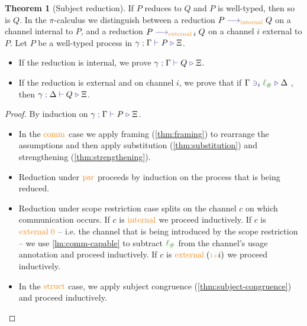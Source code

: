 \documentclass[a4paper,UKenglish,cleveref,autoref,thm-restate,authorcolumns]{lipics-v2019}
\theoremstyle{definition}
\newtheorem{nitheorem}{Theorem}
\newcommand{\picalc}{$\pi$-calculus}
\newcommand{\type}[1]{\textcolor{BlueViolet}{\operatorname{#1}}}
\newcommand{\constr}[1]{\textcolor{BurntOrange}{\operatorname{#1}}}
\newcommand{\func}[1]{\textcolor{OliveGreen}{\operatorname{#1}}}
\newcommand{\suc}{\constr{\scriptstyle 1+}}
\newcommand{\lio}{\func{\ell_{\#}}}
\newcommand{\reduce}[1]{\; \type{\longrightarrow}_{#1} \;}
\newcommand{\types}[4]{#1 \; \type{;} \; #2 \; \type{\vdash} \; #3 \; \type{\triangleright} \; #4}
\newcommand{\containsusage}[4]{#1 \; \type{\ni}_{#2} \; #3 \; \type{\triangleright} \; #4}
\begin{document}
\begin{nitheorem}[Subject reduction]
  If $P$ reduces to $Q$ and $P$ is well-typed, then so is $Q$.
  In the \picalc{} we distinguish between a reduction $P \reduce{\constr{internal}} Q$ on a channel internal to $P$, and a reduction $P \reduce{\constr{external} \; i} Q$ on a channel $i$ external to $P$.
  Let $P$ be a well-typed process in $\types{\gamma}{\Gamma}{P}{\Xi}$.
  \begin{itemize}
    \item If the reduction is internal, we prove $\types{\gamma}{\Gamma}{Q}{\Xi}$.
    \item If the reduction is external and on channel $i$, we prove that if $\containsusage{\Gamma}{i}{\lio}{\Delta}$ , then $\types{\gamma}{\Delta}{Q}{\Xi}$.
  \end{itemize}
\end{nitheorem}

\begin{proof}
  By induction on $\types{\gamma}{\Gamma}{P}{\Xi}$.
  \hfill{}\\
  \begin{itemize}
    \item
    In the $\constr{comm}$ case we apply framing (\autoref{thm:framing}) to rearrange the assumptions and then apply substitution (\autoref{thm:substitution}) and strengthening (\autoref{thm:strengthening}).
  
    \item
    Reduction under $\constr{par}$ proceeds by induction on the process that is being reduced.

    \item
    Reduction under scope restriction case splits on the channel $c$ on which communication occurs.
    If $c$ is $\constr{internal}$ we proceed inductively.
    If $c$ is $\constr{external}\; \constr{0}$ -- i.e. the channel that is being introduced by the scope restriction -- we use \autoref{lm:comm-capable} to subtract $\lio$ from the channel's usage annotation and proceed inductively.
    If $c$ is $\constr{external}\; (\suc i)$ we proceed inductively.

    \item
    In the $\constr{struct}$ case, we apply subject congruence (\autoref{thm:subject-congruence}) and proceed inductively. \qedhere
  \end{itemize}
\end{proof}

\end{document}
